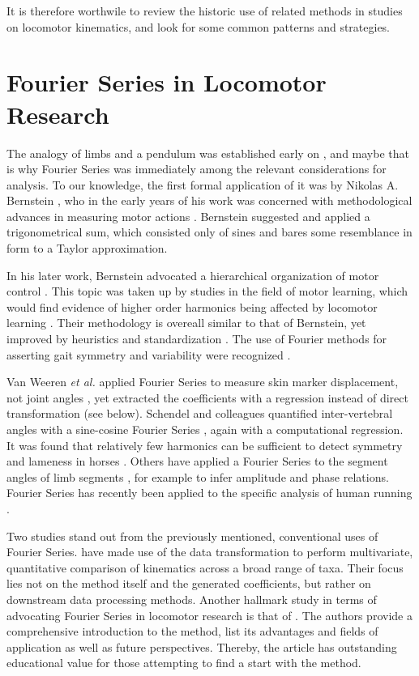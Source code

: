 \documentclass[10pt,a4paper]{article}
\begin{document}
It is therefore worthwile to review the historic use of related methods in studies on locomotor kinematics, and look for some common patterns and strategies.

\FloatBarrier\clearpage
\section{Fourier Series in Locomotor Research}
\label{history}
The analogy of limbs and a pendulum was established early on \citep{Weber1836,Braune1895}, and maybe that is why Fourier Series was immediately among the relevant considerations for analysis.
To our knowledge, the first formal application of it was by Nikolas A. Bernstein \citep{Bernstein1927a,Bernstein1935}, who in the early years of his work was concerned with methodological advances in measuring motor actions \citep{Bongaardt2000}.
Bernstein suggested and applied a trigonometrical sum, which consisted only of sines and bares some resemblance in form to a Taylor approximation.

In his later work, Bernstein advocated a hierarchical organization of motor control \citep[\textit{cf.}][]{Bongaardt2000}.
This topic was taken up by studies in the field of motor learning, which would find evidence of higher order harmonics being affected by locomotor learning \citep{Gallistel1982,Marteniuk1983}.
Their methodology is overeall similar to that of Bernstein, yet improved by heuristics and standardization \citep{Jackson1979,Porges1980}.
The use of Fourier methods for asserting gait symmetry and variability were recognized \citep{Soudan1982}.


Van Weeren \emph{et al.} applied Fourier Series to measure skin marker displacement, not joint angles \citep{vanWeeren1992}, yet extracted the coefficients with a regression instead of direct transformation (see below).
Schendel and colleagues quantified inter-vertebral angles with a sine-cosine Fourier Series \citep{Schendel1995}, again with a computational regression.
It was found that relatively few harmonics can be sufficient to detect symmetry and lameness in horses \citep{Audigie1999,Peham1996}.
Others have applied a Fourier Series to the segment angles of limb segments \citep{Grasso2000}, for example to infer amplitude and phase relations.
Fourier Series has recently been applied to the specific analysis of human running \citep{Skejo2021}.


Two studies stand out from the previously mentioned, conventional uses of Fourier Series.
\citet{Pike2002} have made use of the data transformation to perform multivariate, quantitative comparison of kinematics across a broad range of taxa.
Their focus lies not on the method itself and the generated coefficients, but rather on downstream data processing methods.
Another hallmark study in terms of advocating Fourier Series in locomotor research is that of \citet{Webb2007}.
The authors provide a comprehensive introduction to the method, list its advantages and fields of application as well as future perspectives.
Thereby, the article has outstanding educational value for those attempting to find a start with the method.
\end{document}
